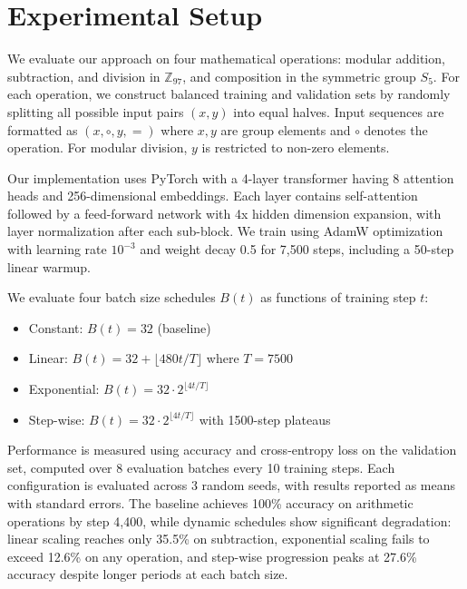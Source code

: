 \documentclass{article} %
\begin{document}
\section{Experimental Setup}
\label{sec:experimental}

We evaluate our approach on four mathematical operations: modular addition, subtraction, and division in $\mathbb{Z}_{97}$, and composition in the symmetric group $S_5$. For each operation, we construct balanced training and validation sets by randomly splitting all possible input pairs $(x,y)$ into equal halves. Input sequences are formatted as $(x, \circ, y, =)$ where $x,y$ are group elements and $\circ$ denotes the operation. For modular division, $y$ is restricted to non-zero elements.

Our implementation uses PyTorch \citep{paszke2019pytorch} with a 4-layer transformer having 8 attention heads and 256-dimensional embeddings. Each layer contains self-attention followed by a feed-forward network with 4x hidden dimension expansion, with layer normalization \citep{ba2016layer} after each sub-block. We train using AdamW optimization \citep{loshchilov2017adamw} with learning rate $10^{-3}$ and weight decay 0.5 for 7,500 steps, including a 50-step linear warmup.

We evaluate four batch size schedules $B(t)$ as functions of training step $t$:
\begin{itemize}
    \item Constant: $B(t) = 32$ (baseline)
    \item Linear: $B(t) = 32 + \lfloor 480t/T \rfloor$ where $T=7500$
    \item Exponential: $B(t) = 32 \cdot 2^{\lfloor 4t/T \rfloor}$
    \item Step-wise: $B(t) = 32 \cdot 2^{\lfloor 4t/T \rfloor}$ with 1500-step plateaus
\end{itemize}

Performance is measured using accuracy and cross-entropy loss on the validation set, computed over 8 evaluation batches every 10 training steps. Each configuration is evaluated across 3 random seeds, with results reported as means with standard errors. The baseline achieves 100\% accuracy on arithmetic operations by step 4,400, while dynamic schedules show significant degradation: linear scaling reaches only 35.5\% on subtraction, exponential scaling fails to exceed 12.6\% on any operation, and step-wise progression peaks at 27.6\% accuracy despite longer periods at each batch size.
\end{document}
